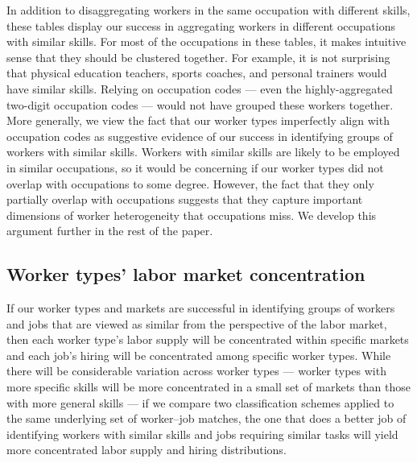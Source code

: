 \documentclass[12pt]{article}
\theoremstyle{definition}
\theoremstyle{plain}
\begin{document}
In addition to disaggregating workers in the same occupation with different skills, these tables display our success in aggregating workers in different occupations with similar skills. For most of the occupations in these tables, it makes intuitive sense that they should be clustered together. For example, it is not surprising that physical education teachers, sports coaches, and personal trainers would have similar skills.  Relying on occupation codes --- even the highly-aggregated two-digit occupation codes --- would not have grouped these workers together. More generally, we view the fact that our worker types imperfectly align with occupation codes as suggestive evidence of our success in identifying groups of workers with similar skills. Workers with similar skills are likely to be employed in similar occupations, so it would be concerning if our worker types did not overlap with occupations to some degree. However, the fact that they only partially overlap with occupations suggests that they capture important dimensions of worker heterogeneity that occupations miss. We develop this argument further in the rest of the paper. 









\subsection{Worker types' labor market concentration}


\label{sec:hhi}

If our worker types and markets are successful in identifying groups of workers and jobs that are viewed as similar from the perspective of the labor market, then each worker type's labor supply will be concentrated within specific markets and each job’s hiring will be concentrated among specific worker types. While there will be considerable variation across worker types --- worker types with more specific skills will be more concentrated in a small set of markets than those with more general skills --- if we compare two classification schemes applied to the same underlying set of worker--job matches, the one that does a better job of identifying workers with similar skills and jobs requiring similar tasks will yield more concentrated labor supply and hiring distributions.
\end{document}
